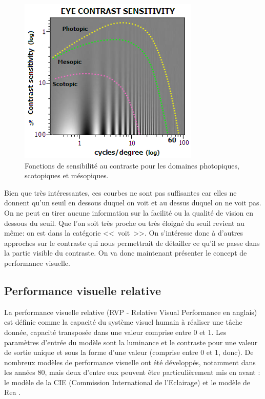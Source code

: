 	\begin{figure}
		\centering
		\includegraphics[scale=.9]{Figures/EyeContrastSensitivity}
		\caption{Fonctions de sensibilité au contraste pour les domaines photopiques, scotopiques et mésopiques.}
		\label{fig:fonction_sensibilite_contraste}
	\end{figure}
	
	\par Bien que très intéressantes, ces courbes ne sont pas suffisantes car elles ne donnent qu'un seuil en dessous duquel on voit et au dessus duquel on ne voit pas. On ne peut en tirer aucune information sur la facilité ou la qualité de vision en dessous du seuil. Que l'on soit très proche ou très éloigné du seuil revient au même: on est dans la catégorie <<~voit~>>. On s'intéresse donc à d'autres approches sur le contraste qui nous permettrait de détailler ce qu'il se passe dans la partie visible du contraste. On va donc maintenant présenter le concept de performance visuelle.
	
	\subsection{Performance visuelle relative}	
	\par La performance visuelle relative (RVP - Relative Visual Performance en anglais) est définie comme la capacité du système visuel humain à réaliser une tâche donnée, capacité transposée dans une valeur comprise entre 0 et 1. Les paramètres d'entrée du modèle sont la luminance et le contraste pour une valeur de sortie unique et sous la forme d'une valeur (comprise entre 0 et 1, donc). De nombreux modèles de performance visuelle ont été développés, notamment dans les années 80, mais deux d'entre eux peuvent être particulièrement mis en avant : le modèle de la CIE (Commission International de l'Eclairage) \citep{international_commission_on_illumination_analytic_1981} et le modèle de Rea \citep{rea_toward_1986}.
	
